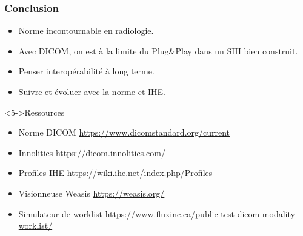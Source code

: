 \frame
{
	\frametitle{Conclusion}	
	
	\begin{itemize}
		\item Norme incontournable en radiologie.
		\item<2-> Avec DICOM, on est \`a la limite du Plug\&Play dans un SIH bien construit.
		\item<3-> Penser interop\'erabilit\'e \`a long terme.
		\item<4-> Suivre et \'evoluer avec la norme et IHE.
	\end{itemize}
	
	\begin{block}<5->{Ressources}
		\begin{itemize}
			\item Norme DICOM \url{https://www.dicomstandard.org/current}
			\item Innolitics \url{https://dicom.innolitics.com/}
			\item Profiles IHE \url{https://wiki.ihe.net/index.php/Profiles}
			\item Visionneuse Weasis \url{https://weasis.org/}
			\item Simulateur de worklist \url{https://www.fluxinc.ca/public-test-dicom-modality-worklist/}
		\end{itemize}
	\end{block}
}
